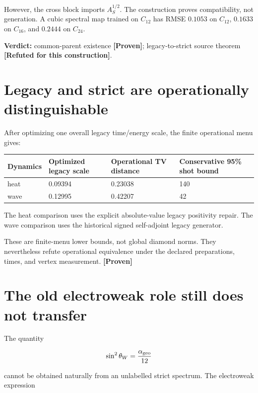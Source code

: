 \documentclass[11pt,a4paper,openany]{report}
\newcommand{\statusProven}{\textcolor{fingreen}{[Proven]}}
\begin{document}
However, the cross block imports \(A_S^{1/2}\). The construction proves compatibility, not generation. A cubic spectral map trained on \(C_{12}\) has RMSE \(0.1053\) on \(C_{12}\), \(0.1633\) on \(C_{16}\), and \(0.2444\) on \(C_{24}\).

\textbf{Verdict:} common-parent existence \textbf{\statusProven{}}; legacy-to-strict source theorem \textbf{[Refuted for this construction]}.

\section{Legacy and strict are operationally distinguishable}

After optimizing one overall legacy time/\allowbreak{}energy scale, the finite operational menu gives:

\begin{center}
\begingroup\small
\setlength{\tabcolsep}{2.5pt}
\renewcommand{\arraystretch}{1.16}
\begin{longtable}{@{}p{}p{}p{}p{}@{}}
\toprule
\textbf{Dynamics} & \textbf{Optimized legacy scale} & \textbf{Operational TV distance} & \textbf{Conservative 95\% shot bound} \\
\midrule
\endhead
heat & 0.09394 & 0.23038 & 140 \\
wave & 0.12995 & 0.42207 & 42 \\
\bottomrule
\end{longtable}
\endgroup
\end{center}

The heat comparison uses the explicit absolute-value legacy positivity repair. The wave comparison uses the historical signed self-adjoint legacy generator.

These are finite-menu lower bounds, not global diamond norms. They nevertheless refute operational equivalence under the declared preparations, times, and vertex measurement. \textbf{\statusProven{}}

\section{The old electroweak role still does not transfer}

The quantity

\[
\sin^2\theta_W=\frac{\alpha_{\rm geo}}{12}
\]

cannot be obtained naturally from an unlabelled strict spectrum. The electroweak expression
\end{document}
